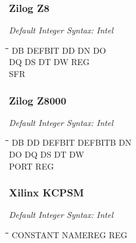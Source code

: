 \subsubsection{Zilog Z8}

{\em Default Integer Syntax: Intel}

{\tt\begin{tabbing}
\hspace{3cm}\=\hspace{3cm}\=\hspace{3cm}\=\hspace{3cm}\=\kill
DB         \> DEFBIT      \> DD          \> DN          \> DO \\
DQ         \> DS          \> DT          \> DW          \> REG \\
SFR \\
\end{tabbing}}

\subsubsection{Zilog Z8000}

{\em Default Integer Syntax: Intel}

{\tt\begin{tabbing}
\hspace{3cm}\=\hspace{3cm}\=\hspace{3cm}\=\hspace{3cm}\=\kill
DB         \> DD          \> DEFBIT      \> DEFBITB    \> DN \\
DO         \> DQ          \> DS          \> DT         \> DW \\
PORT       \> REG         \\
\end{tabbing}}

\subsubsection{Xilinx KCPSM}

{\em Default Integer Syntax: Intel}

{\tt\begin{tabbing}
\hspace{3cm}\=\hspace{3cm}\=\hspace{3cm}\=\hspace{3cm}\=\kill
CONSTANT   \> NAMEREG     \> REG \\
\end{tabbing}}

